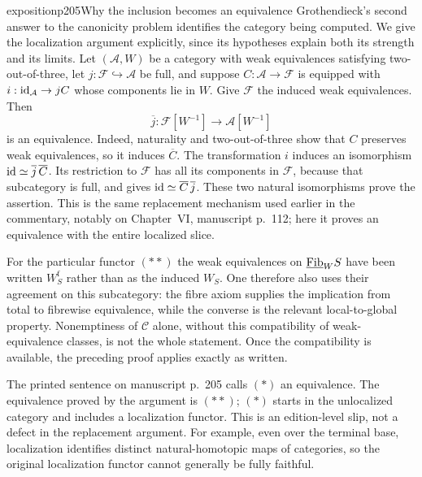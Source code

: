 \begin{dcomment}{exposition}{p205}{Why the inclusion becomes an equivalence}
Grothendieck's second answer to the canonicity problem identifies the category being computed. We give the localization argument explicitly, since its hypotheses explain both its strength and its limits. Let $(\mathcal A,W)$ be a category with weak equivalences satisfying two-out-of-three, let $j:\mathcal F\hookrightarrow\mathcal A$ be full, and suppose $C:\mathcal A\to\mathcal F$ is equipped with $i:\mathrm{id}_{\mathcal A}\to jC$ whose components lie in $W$. Give $\mathcal F$ the induced weak equivalences. Then
\[
 \overline j:\mathcal F[W^{-1}]\longrightarrow\mathcal A[W^{-1}]
\]
is an equivalence. Indeed, naturality and two-out-of-three show that $C$ preserves weak equivalences, so it induces $\overline C$. The transformation $i$ induces an isomorphism $\mathrm{id}\simeq\overline j\,\overline C$. Its restriction to $\mathcal F$ has all its components in $\mathcal F$, because that subcategory is full, and gives $\mathrm{id}\simeq\overline C\,\overline j$. These two natural isomorphisms prove the assertion. This is the same replacement mechanism used earlier in the commentary, notably on Chapter~VI, manuscript p.~112; here it proves an equivalence with the entire localized slice.

For the particular functor $(**)$ the weak equivalences on $\underline{\mathrm{Fib}}_W S$ have been written $W_S^{\mathrm f}$ rather than as the induced $W_S$. One therefore also uses their agreement on this subcategory: the fibre axiom supplies the implication from total to fibrewise equivalence, while the converse is the relevant local-to-global property. Nonemptiness of $\mathcal C$ alone, without this compatibility of weak-equivalence classes, is not the whole statement. Once the compatibility is available, the preceding proof applies exactly as written.

The printed sentence on manuscript p.~205 calls $(*)$ an equivalence. The equivalence proved by the argument is $(**)$; $(*)$ starts in the unlocalized category and includes a localization functor. This is an edition-level slip, not a defect in the replacement argument. For example, even over the terminal base, localization identifies distinct natural-homotopic maps of categories, so the original localization functor cannot generally be fully faithful.


\end{dcomment}
